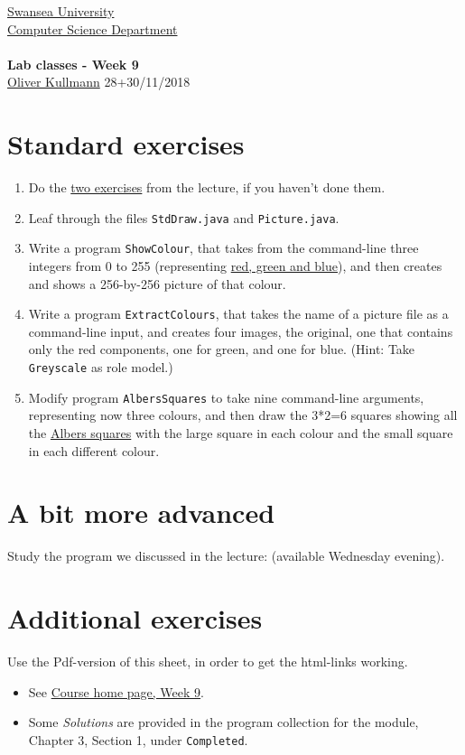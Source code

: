 \documentclass[11pt]{article}
\newcommand{\Java}{\lstset{language=Java,keywordstyle=\bfseries,breaklines,breakindent=30pt}}
\begin{document}
\begin{center}
  \href{http://www.swan.ac.uk/}{Swansea University}\\
  \href{http://www.swan.ac.uk/compsci/}{Computer Science Department}\\[1ex]
  \href{\chp}{\module}\\[1ex]
  \textbf{Lab classes - Week 9}\\
  \href{http://cs.swan.ac.uk/~csoliver}{Oliver Kullmann} 28+30/11/2018
\end{center}


\section{Standard exercises}
\label{sec:stdex}

\Java

\begin{enumerate}
\item Do the \href{\chp#PractiseLectureWeek09}{two exercises} from the lecture, if you haven't done them.
\item Leaf through the files \texttt{StdDraw.java} and \texttt{Picture.java}.
\item Write a program \texttt{ShowColour}, that takes from the command-line three integers from 0 to 255 (representing \href{http://en.wikipedia.org/wiki/RGB_color_model}{red, green and blue}), and then creates and shows a 256-by-256 picture of that colour.
\item Write a program \texttt{ExtractColours}, that takes the name of a picture file as a command-line input, and creates four images, the original, one that contains only the red components, one for green, and one for blue. (Hint: Take \texttt{Greyscale} as role model.)
\item Modify program \texttt{AlbersSquares} to take nine command-line arguments, representing now three colours, and then draw the 3*2=6 squares showing all the \href{http://en.wikipedia.org/wiki/Josef_Albers}{Albers squares} with the large square in each colour and the small square in each different colour.
\end{enumerate}


\section{A bit more advanced}
\label{sec:advanced}

Study the program we discussed in the lecture: (available Wednesday evening).


\section{Additional exercises}
\label{sec:addex}

Use the Pdf-version of this sheet, in order to get the html-links working.
\begin{itemize}
\item See \href{\chp#ExercisesWeek09}{Course home page, Week 9}.
\item Some \emph{Solutions} are provided in the program collection for the module, Chapter 3, Section 1, under \texttt{Completed}.
\end{itemize}
\end{document}

